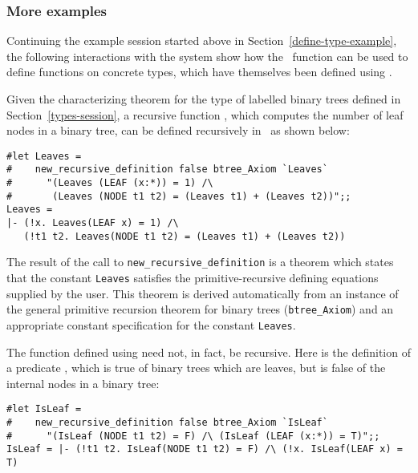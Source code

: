 \subsubsection{More examples}

Continuing the example session started above in Section~\ref{define-type-example},
the following interactions with the system show how the \ML\ function
 can be used to define functions on concrete types,
which have themselves been defined using .

Given the characterizing theorem
 for the type of labelled binary trees
defined in Section~\ref{types-session}, a recursive function , which
computes the number of leaf nodes in a binary tree,
can be defined recursively in \HOL\ as shown below:

\begin{session}\begin{verbatim}
#let Leaves =
#    new_recursive_definition false btree_Axiom `Leaves`
#      "(Leaves (LEAF (x:*)) = 1) /\
#       (Leaves (NODE t1 t2) = (Leaves t1) + (Leaves t2))";;
Leaves =
|- (!x. Leaves(LEAF x) = 1) /\
   (!t1 t2. Leaves(NODE t1 t2) = (Leaves t1) + (Leaves t2))
\end{verbatim}\end{session}

\noindent The result of the call to {\small\verb!new_recursive_definition!} is
a theorem which states that the constant {\small\verb!Leaves!} satisfies the
primitive-recursive defining equations supplied by the user.  This theorem is
derived automatically from an instance of the general primitive recursion
theorem for binary trees ({\small\verb!btree_Axiom!}) and an appropriate
constant specification for the constant {\small\verb!Leaves!}.

The function defined using  need not, in fact, be recursive.
Here is the definition of a predicate \ml{IsLeaf}, which is true of
binary trees which are leaves, but is false of the internal nodes in a
binary tree:

\begin{session}\begin{verbatim}
#let IsLeaf =
#    new_recursive_definition false btree_Axiom `IsLeaf`
#      "(IsLeaf (NODE t1 t2) = F) /\ (IsLeaf (LEAF (x:*)) = T)";;
IsLeaf = |- (!t1 t2. IsLeaf(NODE t1 t2) = F) /\ (!x. IsLeaf(LEAF x) = T)
\end{verbatim}\end{session}

